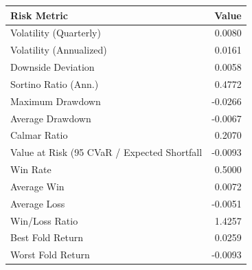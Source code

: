 \begin{tabular}{lr}
\toprule
Risk Metric & Value \\
\midrule
Volatility (Quarterly) & 0.0080 \\
Volatility (Annualized) & 0.0161 \\
Downside Deviation & 0.0058 \\
Sortino Ratio (Ann.) & 0.4772 \\
Maximum Drawdown & -0.0266 \\
Average Drawdown & -0.0067 \\
Calmar Ratio & 0.2070 \\
Value at Risk (95%
CVaR / Expected Shortfall & -0.0093 \\
Win Rate & 0.5000 \\
Average Win & 0.0072 \\
Average Loss & -0.0051 \\
Win/Loss Ratio & 1.4257 \\
Best Fold Return & 0.0259 \\
Worst Fold Return & -0.0093 \\
\bottomrule
\end{tabular}
